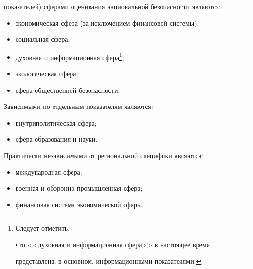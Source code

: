 показателей) сферами оценивания национальной безопасности являются:


    \begin{itemize}


\item экономическая сфера (за исключением финансовой системы);\\[-14pt]


\item социальная сфера;\\[-14pt]


\item духовная и информационная сфера\footnote{Следует отметить,


что <<духовная и информационная сфера>> в настоящее время


представлена, в основном, информационными показателями.};


\item экологическая сфера;\\[-14pt]


\item сфера общественной безопасности.


\end{itemize}


Зависимыми по отдельным показателям являются:


\begin{itemize}


\item внутриполитическая сфера;\\[-14pt]


\item сфера образования и науки.


\end{itemize}


Практически независимыми от региональной специфики являются:


\begin{itemize}


\item международная сфера;\\[-14pt]


\item военная и оборонно-промышленная сфера;\\[-14pt]


\item финансовая система экономической сферы.


\end{itemize}





